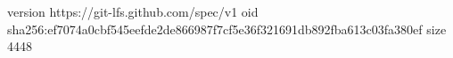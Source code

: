 version https://git-lfs.github.com/spec/v1
oid sha256:ef7074a0cbf545eefde2de866987f7cf5e36f321691db892fba613c03fa380ef
size 4448
